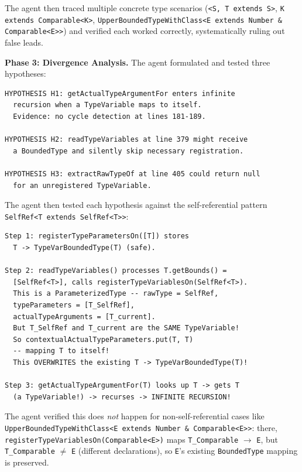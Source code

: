 \documentclass[]{meta}
\begin{document}
The agent then traced multiple concrete type scenarios (\texttt{<S, T extends S>}, \texttt{K extends Comparable<K>}, \texttt{UpperBoundedTypeWithClass<E extends Number \& Comparable<E>>}) and verified each worked correctly, systematically ruling out false leads.

\textbf{Phase 3: Divergence Analysis.} The agent formulated and tested three hypotheses:

\begin{tcolorbox}[colback=gray!5, colframe=gray!50, boxrule=0.3pt, breakable]
\small
\begin{verbatim}
HYPOTHESIS H1: getActualTypeArgumentFor enters infinite
  recursion when a TypeVariable maps to itself.
  Evidence: no cycle detection at lines 181-189.

HYPOTHESIS H2: readTypeVariables at line 379 might receive
  a BoundedType and silently skip necessary registration.

HYPOTHESIS H3: extractRawTypeOf at line 405 could return null
  for an unregistered TypeVariable.
\end{verbatim}
\end{tcolorbox}

The agent then tested each hypothesis against the self-referential pattern \texttt{SelfRef<T extends SelfRef<T>{}>}:

\begin{tcolorbox}[colback=gray!5, colframe=gray!50, boxrule=0.3pt, breakable]
\small
\begin{verbatim}
Step 1: registerTypeParametersOn([T]) stores
  T -> TypeVarBoundedType(T) (safe).

Step 2: readTypeVariables() processes T.getBounds() =
  [SelfRef<T>], calls registerTypeVariablesOn(SelfRef<T>).
  This is a ParameterizedType -- rawType = SelfRef,
  typeParameters = [T_SelfRef],
  actualTypeArguments = [T_current].
  But T_SelfRef and T_current are the SAME TypeVariable!
  So contextualActualTypeParameters.put(T, T)
  -- mapping T to itself!
  This OVERWRITES the existing T -> TypeVarBoundedType(T)!

Step 3: getActualTypeArgumentFor(T) looks up T -> gets T
  (a TypeVariable!) -> recurses -> INFINITE RECURSION!
\end{verbatim}
\end{tcolorbox}

The agent verified this does \emph{not} happen for non-self-referential cases like \texttt{UpperBoundedTypeWithClass<E extends Number \& Comparable<E>{}>}: there, \texttt{registerTypeVariablesOn(Comparable<E>)} maps \texttt{T\_Comparable} $\to$ \texttt{E}, but \texttt{T\_Comparable} $\neq$ \texttt{E} (different declarations), so \texttt{E}'s existing \texttt{BoundedType} mapping is preserved.
\end{document}
